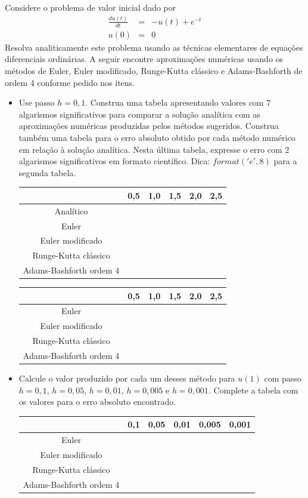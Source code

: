 \begin{exer} Considere o problema de valor inicial dado por
\begin{eqnarray}
\frac{d u(t)}{dt} &=& -u(t) + e^{-t} \\
u(0)&=&0
\end{eqnarray}
Resolva analiticamente este problema usando as técnicas elementares de equações diferenciais ordinárias. A seguir encontre aproximações numéricas usando os métodos de Euler, Euler modificado, Runge-Kutta clássico e Adams-Bashforth de ordem 4 conforme pedido nos itens.
\begin{itemize}
\item[a)] Use passo $h=0,1$. Construa uma tabela apresentando valores com 7 algarismos significativos para comparar a solução analítica com as aproximações numéricas produzidas pelos métodos sugeridos. Construa também uma tabela para o erro absoluto obtido por cada método numérico em relação à solução analítica. Nesta última tabela, expresse o erro com 2 algarismos significativos em formato científico. Dica: $format('e',8)$ para a segunda tabela.
\begin{center}
\begin{tabular}{|c|c|c|c|c|c|}
\hline
&0,5&1,0&1,5&2,0&2,5\\
\hline
Analítico&&&&&\\
\hline
Euler&&&&&\\
\hline
Euler modificado&&&&&\\
\hline
Runge-Kutta clássico&&&&&\\
\hline
Adams-Bashforth ordem 4&&&&&\\
\hline
\end{tabular}
\end{center}

\begin{center}
\begin{tabular}{|c|c|c|c|c|c|}
\hline
&0,5&1,0&1,5&2,0&2,5\\
\hline
Euler&&&&&\\
\hline
Euler modificado&&&&&\\
\hline
Runge-Kutta clássico&&&&&\\
\hline
Adams-Bashforth ordem 4&&&&&\\
\hline
\end{tabular}
\end{center}

\item[b)] Calcule o valor produzido por cada um desses método para $u(1)$ com passo $h=0,1$, $h=0,05$, $h=0,01$, $h=0,005$ e $h=0,001$. Complete a tabela com os valores para o erro absoluto encontrado.
\begin{center}
\begin{tabular}{|c|c|c|c|c|c|}
\hline
&0,1&0,05&0,01&0,005&0,001\\
\hline
Euler&&&&&\\
\hline
Euler modificado&&&&&   \\
\hline
Runge-Kutta clássico&&&&&\\
\hline
Adams-Bashforth ordem 4&&&&&\\
\hline
\end{tabular}
\end{center}


\end{itemize}
\end{exer}
